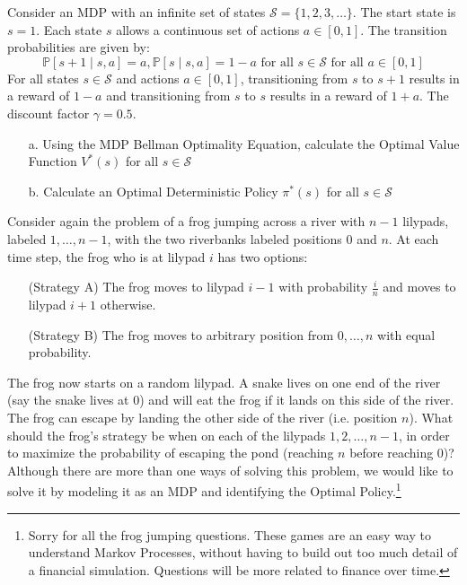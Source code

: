\documentclass[12pt]{exam}
\begin{document}
\begin{questions}
 \question Consider an MDP with an infinite set of states $\mathcal{S} = \{1,2,3,\ldots \}$. The start state is $s=1$. Each state $s$ allows a continuous set of actions $a \in [0,1]$. The transition probabilities are given by: $$\mathbb{P}[s+1 \mid s, a] = a, \mathbb{P}[s \mid s, a] = 1 - a \mbox{ for all } s \in \mathcal{S} \mbox{ for all } a \in [0,1]$$
For all states $s \in \mathcal{S}$ and actions $a \in [0,1]$, transitioning from $s$ to $s+1$ results in a reward of $1-a$ and transitioning from $s$ to $s$ results in a reward of $1+a$. The discount factor $\gamma=0.5$.
\begin{enumerate}
	\item[a.] Using the MDP Bellman Optimality Equation, calculate the Optimal Value Function $V^*(s)$ for all $s \in \mathcal{S}$
	\item[b.] Calculate an Optimal Deterministic Policy $\pi^*(s)$ for all $s \in \mathcal{S}$
\end{enumerate}

\question Consider again the problem of a frog jumping across a river with $n-1$ lilypads, labeled $1, \dots, n-1$, with the two riverbanks labeled positions $0$ and $n$. At each time step, the frog who is at lilypad $i$ has two options:
\begin{enumerate}
	\item [(Strategy A)] The frog moves to lilypad $i-1$  with probability $\frac{i}{n}$ and moves to lilypad $i+1$ otherwise.
	\item [(Strategy B)] The frog moves to arbitrary position from $0,\dots,n$ with equal probability.
\end{enumerate}

The frog now starts on a random lilypad. A snake lives on one end of the river (say the snake lives at 0) and will eat the frog if it lands on this side of the river. The frog can escape by landing the other side of the river (i.e. position $n$). What should the frog's strategy be when on each of the lilypads $1, 2, \ldots, n-1$, in order to maximize the probability of escaping the pond (reaching $n$ before reaching $0$)? Although there are more than one ways of solving this problem, we would like to solve it by modeling it as an MDP and identifying the Optimal Policy.\footnote{Sorry for all the frog jumping questions. These games are an easy way to understand Markov Processes, without having to build out too much detail of a financial simulation. Questions will be more related to finance over time.}


\end{questions}
\end{document}
